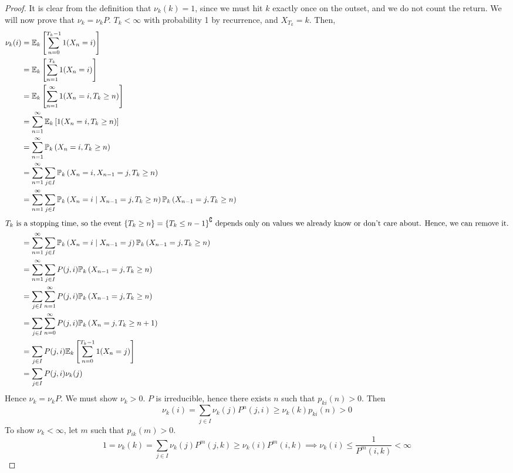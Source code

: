 \begin{proof}
	It is clear from the definition that \( \nu_k(k) = 1 \), since we must hit \( k \) exactly once on the outset, and we do not count the return.
	We will now prove that \( \nu_k = \nu_k P \).
	\( T_k < \infty \) with probability 1 by recurrence, and \( X_{T_k} = k \).
	Then,
	\begin{align*}
		\nu_k(i) &= \mathbb{E}_{k}\left[{\sum_{n=0}^{T_k - 1} 1(X_n = i)}\right] \\
		&= \mathbb{E}_{k}\left[{\sum_{n=1}^{T_k} 1(X_n = i)}\right] \\
		&= \mathbb{E}_{k}\left[{\sum_{n=1}^\infty 1(X_n = i, T_k \geq n)}\right] \\
		&= \sum_{n=1}^\infty \mathbb{E}_{k}\left[{1(X_n = i, T_k \geq n)}\right] \\
		&= \sum_{n=1}^\infty \mathbb{P}_{k}\left({X_n = i, T_k \geq n}\right) \\
		&= \sum_{n=1}^\infty \sum_{j \in I} \mathbb{P}_{k}\left({X_n = i, X_{n-1} = j, T_k \geq n}\right) \\
		&= \sum_{n=1}^\infty \sum_{j \in I} \mathbb{P}_{k}\left({X_n = i \mid X_{n-1} = j, T_k \geq n}\right) \mathbb{P}_{k}\left({X_{n-1} = j, T_k \geq n}\right) \\
		\intertext{\( T_k \) is a stopping time, so the event \( \qty{T_k \geq n} = \qty{T_k \leq n-1}^\complement \) depends only on values we already know or don't care about. Hence, we can remove it.}
		&= \sum_{n=1}^\infty \sum_{j \in I} \mathbb{P}_{k}\left({X_n = i \mid X_{n-1} = j}\right) \mathbb{P}_{k}\left({X_{n-1} = j, T_k \geq n}\right) \\
		&= \sum_{n=1}^\infty \sum_{j \in I} P(j, i) \mathbb{P}_{k}\left({X_{n-1} = j, T_k \geq n}\right) \\
		&= \sum_{j \in I} \sum_{n=1}^\infty P(j, i) \mathbb{P}_{k}\left({X_{n-1} = j, T_k \geq n}\right) \\
		&= \sum_{j \in I} \sum_{n=0}^\infty P(j, i) \mathbb{P}_{k}\left({X_n = j, T_k \geq n + 1}\right) \\
		&= \sum_{j \in I} P(j, i) \mathbb{E}_{k}\left[{\sum_{n=0}^{T_k - 1} 1(X_n = j)}\right] \\
		&= \sum_{j \in I} P(j, i) \nu_k(j)
	\end{align*}
	Hence \( \nu_k = \nu_k P \).
	We must show \( \nu_k > 0 \).
	\( P \) is irreducible, hence there exists \( n \) such that \( p_{ki}(n) > 0 \).
	Then
	\[ \nu_k(i) = \sum_{j \in I} \nu_k(j) P^n(j,i) \geq \nu_k(k) p_{ki}(n) > 0 \]
	To show \( \nu_k < \infty \), let \( m \) such that \( p_{ik}(m) > 0 \).
	\[ 1 = \nu_k(k) = \sum_{j \in I} \nu_k(j) P^m(j,k) \geq \nu_k(i) P^m(i,k) \implies \nu_k(i) \leq \frac{1}{P^m(i,k)} < \infty \]
\end{proof}
